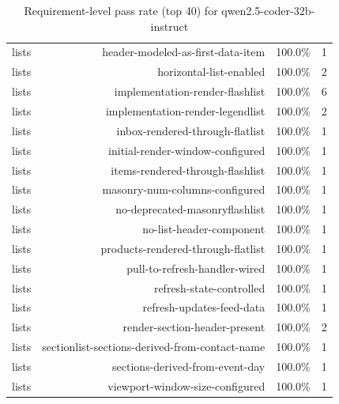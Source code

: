 \begin{table}[htbp]
\begin{tabular}{lrrr}
lists & header-modeled-as-first-data-item & 100.0\% & 1 \\
lists & horizontal-list-enabled & 100.0\% & 2 \\
lists & implementation-render-flashlist & 100.0\% & 6 \\
lists & implementation-render-legendlist & 100.0\% & 2 \\
lists & inbox-rendered-through-flatlist & 100.0\% & 1 \\
lists & initial-render-window-configured & 100.0\% & 1 \\
lists & items-rendered-through-flashlist & 100.0\% & 1 \\
lists & masonry-num-columns-configured & 100.0\% & 1 \\
lists & no-deprecated-masonryflashlist & 100.0\% & 1 \\
lists & no-list-header-component & 100.0\% & 1 \\
lists & products-rendered-through-flatlist & 100.0\% & 1 \\
lists & pull-to-refresh-handler-wired & 100.0\% & 1 \\
lists & refresh-state-controlled & 100.0\% & 1 \\
lists & refresh-updates-feed-data & 100.0\% & 1 \\
lists & render-section-header-present & 100.0\% & 2 \\
lists & sectionlist-sections-derived-from-contact-name & 100.0\% & 1 \\
lists & sections-derived-from-event-day & 100.0\% & 1 \\
lists & viewport-window-size-configured & 100.0\% & 1 \\
\bottomrule
\end{tabular}
\caption{Requirement-level pass rate (top 40) for qwen2.5-coder-32b-instruct}
\end{table}

